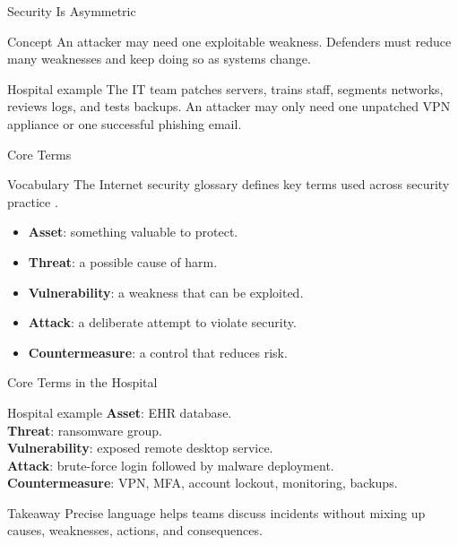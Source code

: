 \documentclass[presentation]{beamer}
\begin{document}
\begin{frame}[c]{Security Is Asymmetric}
\begin{block}{Concept}
An attacker may need one exploitable weakness. Defenders must reduce many weaknesses and keep
doing so as systems change.
\end{block}

\begin{exampleblock}{Hospital example}
The IT team patches servers, trains staff, segments networks, reviews logs, and tests backups.
An attacker may only need one unpatched VPN appliance or one successful phishing email.
\end{exampleblock}
\end{frame}

\begin{frame}[c]{Core Terms}
\begin{block}{Vocabulary}
The Internet security glossary defines key terms used across security practice \cite{rfc4949}.
\end{block}

\begin{itemize}
    \item \textbf{Asset}: something valuable to protect.
    \item \textbf{Threat}: a possible cause of harm.
    \item \textbf{Vulnerability}: a weakness that can be exploited.
    \item \textbf{Attack}: a deliberate attempt to violate security.
    \item \textbf{Countermeasure}: a control that reduces risk.
\end{itemize}
\end{frame}

\begin{frame}[c]{Core Terms in the Hospital}
\begin{exampleblock}{Hospital example}
\textbf{Asset}: EHR database.\\
\textbf{Threat}: ransomware group.\\
\textbf{Vulnerability}: exposed remote desktop service.\\
\textbf{Attack}: brute-force login followed by malware deployment.\\
\textbf{Countermeasure}: VPN, MFA, account lockout, monitoring, backups.
\end{exampleblock}

\begin{block}{Takeaway}
Precise language helps teams discuss incidents without mixing up causes, weaknesses, actions,
and consequences.
\end{block}
\end{frame}
\end{document}
